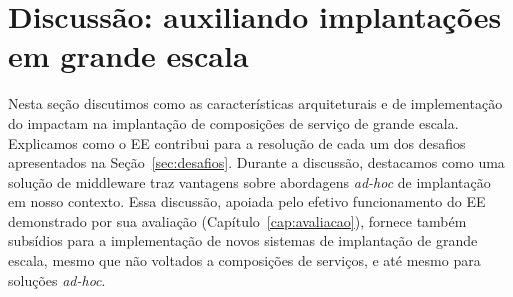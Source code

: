 \section{Discussão: auxiliando implantações em grande escala}

Nesta seção discutimos como as características arquiteturais e de implementação do \ee
impactam na implantação de composições de serviço de grande escala.
Explicamos como o EE contribui para a resolução de cada um dos desafios
apresentados na Seção~\ref{sec:desafios}.
Durante a discussão, destacamos como uma solução de middleware traz vantagens
sobre abordagens \emph{ad-hoc} de implantação em nosso contexto.
Essa discussão, apoiada pelo efetivo funcionamento do EE demonstrado por sua avaliação
(Capítulo~\ref{cap:avaliacao}), fornece também subsídios para a implementação de novos sistemas
de implantação de grande escala, mesmo que não voltados a composições de serviços,
e até mesmo para soluções \emph{ad-hoc}.

